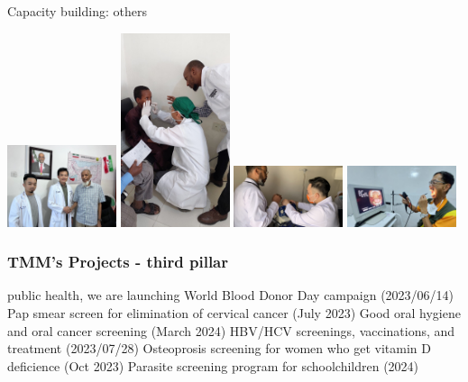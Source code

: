 \documentclass[aspectratio=169]{beamer}
\begin{document}
\begin{frame}{Capacity building: others}
    \begin{center}
        \includegraphics[width=0.24\textwidth]{IMG-5107.JPG}
        \includegraphics[width=0.24\textwidth]{IMG-4703.JPG}
        \includegraphics[width=0.24\textwidth]{IMG-5062.JPG}
        \includegraphics[width=0.24\textwidth]{6a625355-ae53-4e8f-891e-38a933f6c29b.JPG}    
    \end{center}
\end{frame}
\begin{frame}
\frametitle{TMM's Projects - third pillar}
\begin{outline}    
    \1 public health, we are launching
        \2 World Blood Donor Day campaign (2023/06/14)
        \2 Pap smear screen for elimination of cervical cancer (July 2023)
        \2 Good oral hygiene and oral cancer screening (March 2024)
        \2 HBV/HCV screenings, vaccinations, and treatment (2023/07/28)
        \2 Osteoprosis screening for women who get vitamin D deficience (Oct 2023)
        \2 Parasite screening program for schoolchildren (2024)
\end{outline}

\begin{center}





\end{center}

\end{frame}
\end{document}
